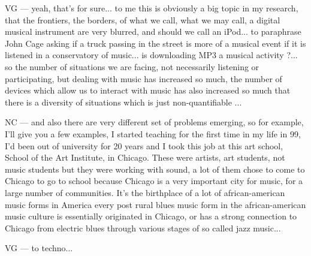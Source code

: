 VG — yeah, that's for sure... to me this is obviously a big topic in my research, that the frontiers, the borders, of what we call, what we may call, a digital musical instrument are very blurred,  and should we call an iPod... to paraphrase John Cage asking if a truck passing in the street is more of a musical event if it is listened in a conservatory of music... is downloading MP3 a musical activity ?... so the number of situations we are facing, not necessarily listening or participating, but dealing with music has increased so much, the number of devices which allow us to interact with music has also increased so much that there is a diversity of situations which is just non-quantifiable ... 

NC — and also there are very different set of problems emerging, so for example, I'll give you a few examples, I started teaching for the first time in my life in 99, I'd been out of university for 20 years and I took this job at this art school, School of the Art Institute, in Chicago.  These were artists, art students, not music students but they were working with sound, a lot of them chose to come to Chicago to go to school because Chicago is a very important city for music, for a large number of communities. It's the birthplace of a lot of african-american music forms in America every post rural blues music form in the african-american music culture is essentially originated in Chicago, or has a strong connection to Chicago from electric blues through various stages of so called jazz music... 

VG — to techno... 


